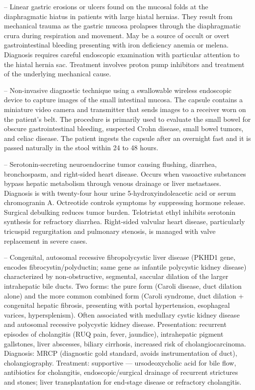 -- Linear gastric erosions or ulcers found on the mucosal folds at the diaphragmatic hiatus in patients with large hiatal hernias. They result from mechanical trauma as the gastric mucosa prolapses through the diaphragmatic crura during respiration and movement. May be a source of occult or overt gastrointestinal bleeding presenting with iron deficiency anemia or melena. Diagnosis requires careful endoscopic examination with particular attention to the hiatal hernia sac. Treatment involves proton pump inhibitors and treatment of the underlying mechanical cause.

-- Non-invasive diagnostic technique using a swallowable wireless endoscopic device to capture images of the small intestinal mucosa. The capsule contains a miniature video camera and transmitter that sends images to a receiver worn on the patient's belt. The procedure is primarily used to evaluate the small bowel for obscure gastrointestinal bleeding, suspected Crohn disease, small bowel tumors, and celiac disease. The patient ingests the capsule after an overnight fast and it is passed naturally in the stool within 24 to 48 hours.

-- Serotonin-secreting neuroendocrine tumor causing flushing, diarrhea, bronchospasm, and right-sided heart disease. Occurs when vasoactive substances bypass hepatic metabolism through venous drainage or liver metastases. Diagnosis is with twenty-four hour urine 5-hydroxyindoleacetic acid or serum chromogranin A. Octreotide controls symptoms by suppressing hormone release. Surgical debulking reduces tumor burden. Telotristat ethyl inhibits serotonin synthesis for refractory diarrhea. Right-sided valvular heart disease, particularly tricuspid regurgitation and pulmonary stenosis, is managed with valve replacement in severe cases.

-- Congenital, autosomal recessive fibropolycystic liver disease (PKHD1 gene, encodes fibrocystin/polyductin; same gene as infantile polycystic kidney disease) characterized by non-obstructive, segmental, saccular dilation of the larger intrahepatic bile ducts. Two forms: the pure form (Caroli disease, duct dilation alone) and the more common combined form (Caroli syndrome, duct dilation + congenital hepatic fibrosis, presenting with portal hypertension, esophageal varices, hypersplenism). Often associated with medullary cystic kidney disease and autosomal recessive polycystic kidney disease. Presentation: recurrent episodes of cholangitis (RUQ pain, fever, jaundice), intrahepatic pigment gallstones, liver abscesses, biliary cirrhosis, increased risk of cholangiocarcinoma. Diagnosis: MRCP (diagnostic gold standard, avoids instrumentation of duct), cholangiography. Treatment: supportive — ursodeoxycholic acid for bile flow, antibiotics for cholangitis, endoscopic/surgical drainage of recurrent strictures and stones; liver transplantation for end-stage disease or refractory cholangitis.

